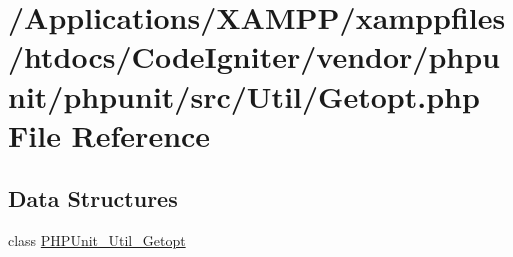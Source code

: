 \hypertarget{_getopt_8php}{}\section{/\+Applications/\+X\+A\+M\+P\+P/xamppfiles/htdocs/\+Code\+Igniter/vendor/phpunit/phpunit/src/\+Util/\+Getopt.php File Reference}
\label{_getopt_8php}
\subsection*{Data Structures}
\begin{DoxyCompactItemize}
\item 
class \mbox{\hyperlink{class_p_h_p_unit___util___getopt}{P\+H\+P\+Unit\+\_\+\+Util\+\_\+\+Getopt}}
\end{DoxyCompactItemize}
